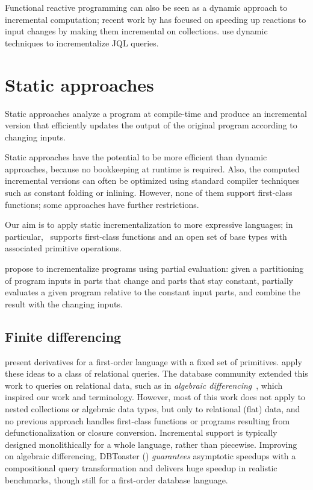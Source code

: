 Functional reactive programming \citep{Elliott:1997:FRA:258948.258973}
can also be seen as a dynamic approach to incremental computation;
recent work by \citet{Maier2013} has
focused on speeding up reactions to input changes by making them
incremental on collections. \citet{Willis08} use dynamic techniques
 to incrementalize JQL queries.

\section{Static approaches}
Static approaches analyze a program at compile-time and produce an
incremental version that efficiently updates the output
of the original program according to changing inputs.

Static approaches have the potential to be more efficient than dynamic approaches,
because no bookkeeping at runtime is required. Also, the computed incremental
versions can often be optimized using standard compiler techniques
such as constant folding or inlining.
However, none of them support first-class functions; some
approaches have further restrictions.

Our aim is to apply static incrementalization to more expressive languages;
in particular, \ILC\ supports first-class functions and an open
set of base types with associated primitive operations.

\citet{Sundaresh91} propose to incrementalize programs using
partial evaluation: given a partitioning of program inputs in parts
that change and parts that stay constant,
\citeauthor{Sundaresh91} partially evaluates a given program relative
to the constant input parts, and combine the result with the
changing inputs.

\subsection{Finite differencing}
\label{sec:finite-diff}
\citet{Paige82FDC} present derivatives for a first-order language
with a fixed set of primitives.
\citet{Blakeley:1986:EUM} apply these ideas to a class of relational queries.
The database community extended
this work to queries on relational data, such as in \emph{algebraic
  differencing}~\citep{Gupta99MMV}, which inspired our work and
terminology. However, most of this work does not apply to nested
collections or algebraic data types, but only to relational
(flat) data, and no previous approach handles first-class
functions or programs resulting from defunctionalization or
closure conversion. Incremental support is typically designed
monolithically for a whole language, rather than piecewise.
Improving on algebraic differencing, DBToaster (\citet{Koch10IQE,Koch14})
\emph{guarantees} asymptotic speedups with a compositional query
transformation and delivers huge speedup in realistic benchmarks,
though still for a first-order database language.

